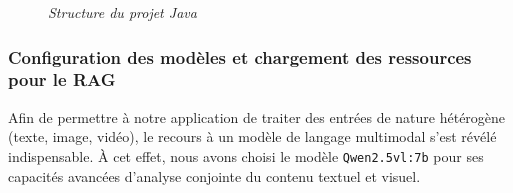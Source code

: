 \documentclass[12pt,a4paper]{report}
\begin{document}
	\begin{figure}[H]
		\centering
		\caption{\textit{Structure du projet Java}}
		\label{fig:structure-projet}
	\end{figure}
	
	\subsubsection{Configuration des modèles et chargement des ressources pour le RAG}
	
	Afin de permettre à notre application de traiter des entrées de nature hétérogène (texte, image, vidéo), le recours à un modèle de langage multimodal s’est révélé indispensable. À cet effet, nous avons choisi le modèle \verb|Qwen2.5vl:7b| pour ses capacités avancées d’analyse conjointe du contenu textuel et visuel.
	
\end{document}
